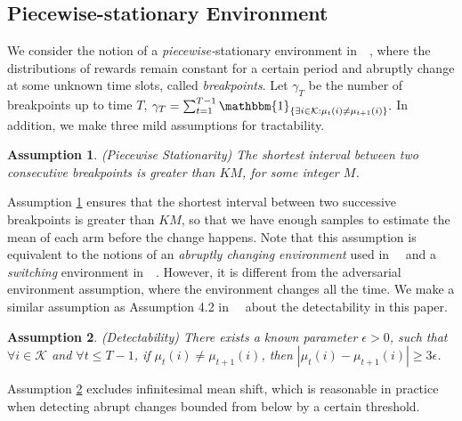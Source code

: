 \documentclass[letterpaper]{article} %
\newtheorem{assumption}{Assumption}
\begin{document}
\subsection{Piecewise-stationary Environment}
We consider the notion of a \emph{piecewise-}stationary environment in~\citeauthor{yu2009piecewise}~, where the distributions of rewards remain constant for a certain period and abruptly change at some unknown time slots, called \emph{breakpoints}. Let $\gamma_T$ be the number of breakpoints up to time $T$, $\gamma_T=\sum_{t=1}^{T-1}\mathbbm{1}_{\{\exists i\in\mathcal{K}: \mu_t(i)\neq \mu_{t+1}(i)\}}.$
In addition, we make three mild assumptions for tractability.
\begin{assumption}\label{ass:piecewise}
\emph{(Piecewise Stationarity)} The shortest interval between two consecutive breakpoints is greater than $K M$, for some integer $M$.
\end{assumption}
Assumption \ref{ass:piecewise} ensures that the shortest interval between two successive breakpoints is greater than $K M$, so that we have enough samples to estimate the mean of each arm before the change happens. Note that this assumption is equivalent to the notions of an \emph{abruptly changing environment} used in~\citeauthor{garivier2008upper}~ and a \emph{switching} environment in~\citeauthor{mellor2013thompson}~. However, it is different from the adversarial environment assumption, where the environment changes all the time.
We make a similar assumption as Assumption 4.2 in~\citeauthor{yu2009piecewise}~ about the detectability in this paper.
\begin{assumption}\label{ass:detectability}
\emph{(Detectability)} There exists a known parameter $\epsilon>0$, such that $\forall i\in\mathcal{K}$ and $\forall t\leq T-1$, if $\mu_t(i)\neq\mu_{t+1}(i)$, then $|\mu_t(i)-\mu_{t+1}(i)|\geq 3\epsilon$.
\end{assumption}
Assumption \ref{ass:detectability} excludes infinitesimal mean shift, which is reasonable in practice when detecting abrupt changes bounded from below by a certain threshold.
\end{document}
